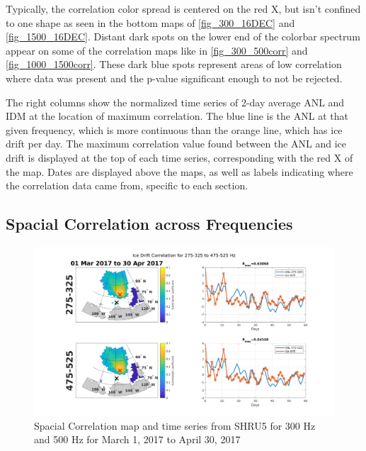 Typically, the correlation color spread is centered on the red X, but isn't confined to one shape as seen in the bottom maps of \autoref{fig_300_16DEC} and \autoref{fig_1500_16DEC}. Distant dark spots on the lower end of the colorbar spectrum appear on some of the correlation maps like in \autoref{fig_300_500corr} and \autoref{fig_1000_1500corr}. These dark blue spots represent areas of low correlation where data was present and the p-value significant enough to not be rejected.

The right columns show the normalized time series of 2-day average ANL and IDM at the location of maximum correlation. The blue line is the ANL at that given frequency, which is more continuous than the orange line, which has ice drift per day. The maximum correlation value found between the ANL and ice drift is displayed at the top of each time series, corresponding with the red X of the map. Dates are displayed above the maps, as well as labels indicating where the correlation data came from, specific to each section.




\subsection{Spacial Correlation across Frequencies} \label{sec_spa_corr_freqs}

\begin{figure}[p]
\centering
\includegraphics[scale=0.35]{Figures/300_500_spatial_corr_20170301-20170430.png}
\caption{Spacial Correlation map and time series from SHRU5 for 300 Hz and 500 Hz for March 1, 2017 to April 30, 2017}
\label{fig_300_500corr}
\end{figure}


